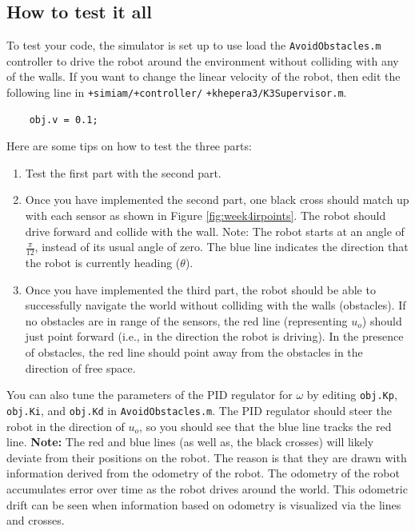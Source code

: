 \documentclass[10pt]{article}
\begin{document}
\subsection*{How to test it all}

To test your code, the simulator is set up to use load the \texttt{AvoidObstacles.m} controller to drive the robot around the environment without colliding with any of the walls. If you want to change the linear velocity of the robot, then edit the following line in \texttt{+simiam/+controller/} \texttt{+khepera3/K3Supervisor.m}.
  \begin{verbatim}
    obj.v = 0.1;\end{verbatim}

Here are some tips on how to test the three parts:

\begin{enumerate}
  \item Test the first part with the second part.
  \item Once you have implemented the second part, one black cross should match up with each sensor as shown in Figure \ref{fig:week4irpoints}. The robot should drive forward and collide with the wall. Note: The robot starts at an angle of $\frac{\pi}{12}$, instead of its usual angle of zero. The blue line indicates the direction that the robot is currently heading ($\theta$).
  \item Once you have implemented the third part, the robot should be able to successfully navigate the world without colliding with the walls (obstacles). If no obstacles are in range of the sensors, the red line (representing $u_o$) should just point forward (i.e., in the direction the robot is driving). In the presence of obstacles, the red line should point away from the obstacles in the direction of free space.
\end{enumerate}

You can also tune the parameters of the PID regulator for $\omega$ by editing \texttt{obj.Kp}, \texttt{obj.Ki}, and \texttt{obj.Kd} in \texttt{AvoidObstacles.m}. The PID regulator should steer the robot in the direction of $u_o$, so you should see that the blue line tracks the red line. \textbf{Note:} The red and blue lines (as well as, the black crosses) will likely deviate from their positions on the robot. The reason is that they are drawn with information derived from the odometry of the robot. The odometry of the robot accumulates error over time as the robot drives around the world. This odometric drift can be seen when information based on odometry is visualized via the lines and crosses. 
\end{document}
